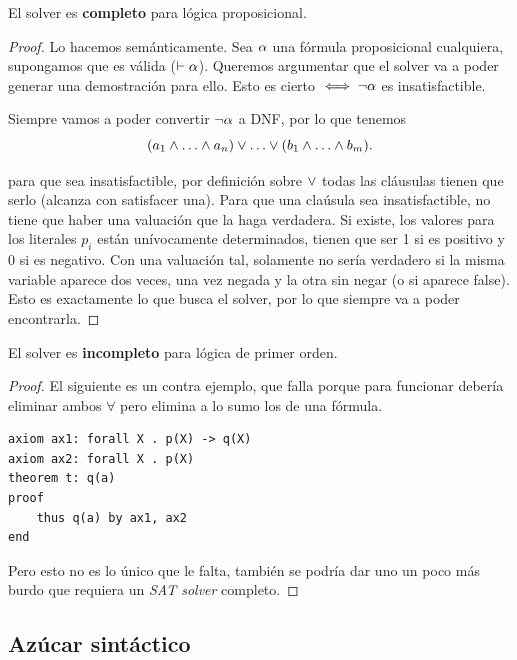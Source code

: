 \begin{theorem}
    El solver es \textbf{completo} para lógica proposicional.
\end{theorem}
\begin{proof}
Lo hacemos semánticamente. Sea $\alpha$ una fórmula proposicional cualquiera, supongamos que es válida ($\vdash \alpha$). Queremos argumentar que el solver va a poder generar una demostración para ello. Esto es cierto $\iff \neg \alpha$ es insatisfactible.

Siempre vamos a poder convertir $\neg \alpha$ a DNF, por lo que tenemos
\[
    (\formLit_1 \fAnd \dots \fAnd \formLit_n)
    \fOr \dots \fOr
    (\formLitTwo_1 \fAnd \dots \fAnd \formLitTwo_m).
\]

para que sea insatisfactible, por definición sobre $\vee$ todas las
cláusulas tienen que serlo (alcanza con satisfacer una). Para que una claúsula
sea insatisfactible, no tiene que haber una valuación que la haga verdadera. Si
existe, los valores para los literales $p_i$ están unívocamente determinados,
tienen que ser 1 si es positivo y 0 si es negativo. Con una valuación tal,
solamente no sería verdadero si la misma variable aparece dos veces, una vez
negada y la otra sin negar (o si aparece false). Esto es exactamente lo que busca el solver, por lo que siempre va a poder encontrarla.
\end{proof}

\begin{theorem}
    El solver es \textbf{incompleto} para lógica de primer orden.
\end{theorem}
\begin{proof}
El siguiente es un contra ejemplo, que falla porque para funcionar debería eliminar ambos $\forall$ pero elimina a lo sumo los de una fórmula.
\begin{lstlisting}
axiom ax1: forall X . p(X) -> q(X)
axiom ax2: forall X . p(X)
theorem t: q(a)
proof
    thus q(a) by ax1, ax2
end
\end{lstlisting}

Pero esto no es lo único que le falta, también se podría dar uno un poco más burdo que requiera un \textit{SAT solver} completo.
\end{proof}

\subsection{Azúcar sintáctico}

